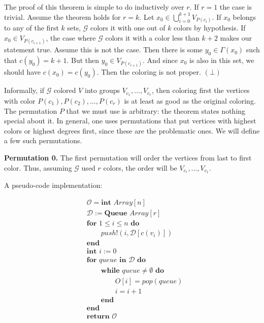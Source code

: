 \documentclass[a4paper, 12pt]{article}
\begin{document}
The proof of this theorem is simple to do inductively over $r$. If $r = 1$ the
case is trivial. Assume the theorem holds for $r = k$. Let $x_0 \in
\bigcup_{i=0}^{k+1} V_{P(c_{i})}$. If $x_0$ belongs to any of the first $k$
sets, $\mathcal{G}$ colors it with one out of $k$ colors by hypothesis. If $x_0
\in V_{P(c_{i+1})}$, the case where $\mathcal{G}$ colors it with a color less
than $k+2$ makes our statement true. Assume this is not the case. Then there is
some $y_0 \in \Gamma(x_0)$ such that $c(y_0) = k + 1$. But then $y_0 \in
V_{P(c_{i+1})}$. And since $x_0$ is also in this set, we should have $c(x_0) =
c(y_0)$. Then the coloring is not proper. $(\bot)$

Informally, if $\mathcal{G}$ colored $V$ into groups $V_{c_1}, \ldots,
V_{c_r}$, then coloring first the vertices with color $P(c_1), P(c_2), \ldots,
P(c_r)$ is at least as good as the original coloring. The permutation $P$ that
we must use is arbitrary: the theorem states nothing special about it. In
general, one uses permutations that put vertices with highest colors or highest
degrees first, since these are the problematic ones. We will define a few such
permutations.

\textbf{Permutation 0.} The first permutation will order the vertices from last
to first color. Thus, assuming $\mathcal{G}$ used $r$ colors, the order will be
$V_{c_r}, \ldots, V_{c_1}$. 

A pseudo-code implementation:

\begin{align*}
    &\mathcal{O} = \textbf{int } Array[n]\\
    &\mathcal{D} := \textbf{Queue } Array[r] \\
    &\textbf{for } 1 \leq i \leq n \textbf{ do} \\ 
    &\qquad push!(i, \mathcal{D}[c(v_i)])\\
    &\textbf{end}\\
    &\textbf{int } i := 0\\
    &\textbf{for } queue \textbf{ in } \mathcal{D} \textbf{ do}\\
    &\qquad\textbf{while } queue \neq \emptyset \textbf{ do}\\
    &\qquad \qquad O[i] = pop(queue) \\ 
    &\qquad \qquad i = i + 1\\
    &\qquad\textbf{end}\\
    &\textbf{end}\\
    &\textbf{return } \mathcal{O}
\end{align*}
\end{document}
